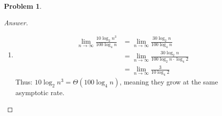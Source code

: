 \documentclass[11pt]{article}
\theoremstyle{definition}
\theoremstyle{definition}
\newtheorem{required}{Problem}
\theoremstyle{definition}
\begin{document}
\begin{required}
\begin{enumerate} [label=(\alph*)]
\begin{proof}[Answer]
\begin{enumerate}
\item
\begin{align*}
\lim_{n \to \infty} \frac{10 \log_2 n^3}{100\log_4 n} &= \lim_{n \to \infty} \frac{30 \log_2 n}{ 100\log_4 n} \\
&= \lim_{n \to \infty} \frac{30 \log_2 n}{100 \log_2 n \cdot \log_4 2} \\
&= \lim_{n \to \infty} \frac{3}{10\log_4 2} 
\end{align*}
Thus: $10 \log_2 n^3 = \Theta(100\log_4 n)$, meaning they grow at the same asymptotic rate.
\end{enumerate}

    \end{proof}
\end{enumerate}

\end{required}

\newpage
\end{document}
